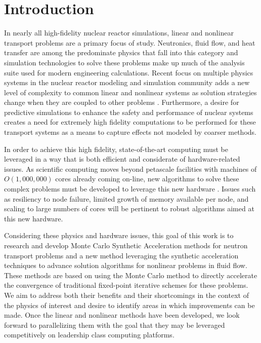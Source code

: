 \chapter{Introduction}
\label{ch:introduction}
In nearly all high-fidelity nuclear reactor simulations, linear and
nonlinear transport problems are a primary focus of study. Neutronics,
fluid flow, and heat transfer are among the predominate physics that
fall into this category and simulation technologies to solve these
problems make up much of the analysis suite used for modern
engineering calculations. Recent focus on multiple physics systems in
the nuclear reactor modeling and simulation community adds a new level
of complexity to common linear and nonlinear systems as solution
strategies change when they are coupled to other problems
\cite{u.s._department_of_energy_casl_2011}. Furthermore, a desire for
predictive simulations to enhance the safety and performance of
nuclear systems creates a need for extremely high fidelity
computations to be performed for these transport systems as a means to
capture effects not modeled by coarser methods.

In order to achieve this high fidelity, state-of-the-art computing
 must be leveraged in a way that is both efficient
and considerate of hardware-related issues. As scientific computing
moves beyond petascale facilities with machines of $O(1,000,000)$
cores already coming on-line, new algorithms to solve these complex
problems must be developed to leverage this new hardware
\cite{kogge_using_2011}. Issues such as resiliency to node failure,
limited growth of memory available per node, and scaling to large
numbers of cores will be pertinent to robust algorithms aimed at this
new hardware. 

Considering these physics and hardware issues, this goal of this work
is to research and develop Monte Carlo Synthetic Acceleration methods
for neutron transport problems and a new method leveraging the
synthetic acceleration techniques to advance solution algorithms for
nonlinear problems in fluid flow. These methods are based on using the
Monte Carlo method to directly accelerate the convergence of
traditional fixed-point iterative schemes for these problems. We aim
to address both their benefits and their shortcomings in the context
of the physics of interest and desire to identify areas in which
improvements can be made. Once the linear and nonlinear methods have
been developed, we look forward to parallelizing them with the goal
that they may be leveraged competitively on leadership class computing
platforms.

